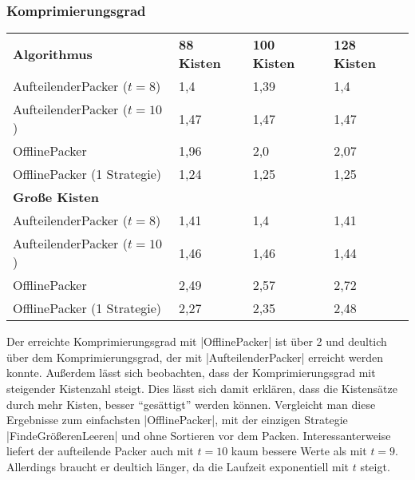 \subsubsection*{Komprimierungsgrad}
\begin{tabular}{llll}
\textbf{Algorithmus} 	& \textbf{88 Kisten} 	& \textbf{100 Kisten} 	& \textbf{128 Kisten} 	\\
 AufteilenderPacker ($t=8$)  	& 1,4		& 1,39			& 1,4			\\
 AufteilenderPacker ($t=10$)	& 1,47		& 1,47			& 1,47			\\
 OfflinePacker			& 1,96		& 2,0			& 2,07			\\
 OfflinePacker (1 Strategie)	& 1,24		& 1,25			& 1,25		\vspace*{.48em} \\
\textbf{Große Kisten} & & & \\
 AufteilenderPacker ($t=8$)  	& 1,41		& 1,4			& 1,41			\\
 AufteilenderPacker ($t=10$)	& 1,46		& 1,46			& 1,44			\\
 OfflinePacker			& 2,49		& 2,57			& 2,72			\\
 OfflinePacker (1 Strategie)	& 2,27		& 2,35			& 2,48			\\
\end{tabular}

 Der erreichte Komprimierungsgrad mit |OfflinePacker| ist über 2 und deultich über dem Komprimierungsgrad, der mit |AufteilenderPacker|
  erreicht werden konnte. Außerdem lässt sich beobachten, dass der Komprimierungsgrad mit steigender Kistenzahl steigt.
 Dies lässt sich damit erklären, dass die Kistensätze durch mehr Kisten, besser ``gesättigt'' werden können.
 Vergleicht man diese Ergebnisse zum einfachsten |OfflinePacker|,
  mit der einzigen Strategie |FindeGrößerenLeeren| und ohne Sortieren vor dem Packen.
 Interessanterweise liefert der aufteilende Packer auch mit $t=10$ kaum bessere Werte als mit $t=9$.
 Allerdings braucht er deultich länger, da die Laufzeit exponentiell mit $t$ steigt.

